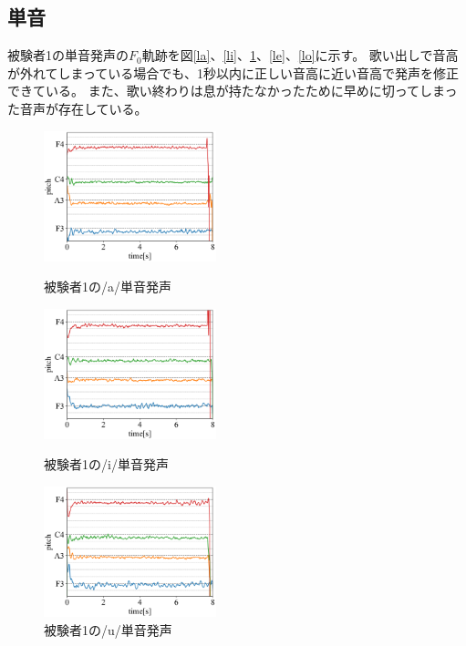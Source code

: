 \documentclass[10.5ptj,a4j,dvipdfmx,uplatex, oneside, openany, report]{jsbook}%
\begin{document}
\subsection{単音}
被験者1の単音発声の$F_0$軌跡を図\ref{la}、\ref{li}、\ref{lu}、\ref{le}、\ref{lo}に示す。
歌い出しで音高が外れてしまっている場合でも、1秒以内に正しい音高に近い音高で発声を修正できている。
また、歌い終わりは息が持たなかったために早めに切ってしまった音声が存在している。


\begin{figure}[thbp]
    \begin{minipage}{0.33\hsize}
        \begin{center}
            \includegraphics[width=5cm]{long/long_1_a.png}
            \caption{被験者1の/a/単音発声}
            \label{la}
        \end{center}
    \end{minipage}
    \begin{minipage}{0.33\hsize}
        \begin{center}
            \includegraphics[width=5cm]{long/long_1_i.png}
            \caption{被験者1の/i/単音発声}
            \label{li}
        \end{center}
    \end{minipage}
    \begin{minipage}{0.33\hsize}
        \begin{center}
            \includegraphics[width=5cm]{long/long_1_u.png} 
            \caption{被験者1の/u/単音発声}
            \label{lu}
        \end{center}
    \end{minipage}
\end{figure}
\end{document}
